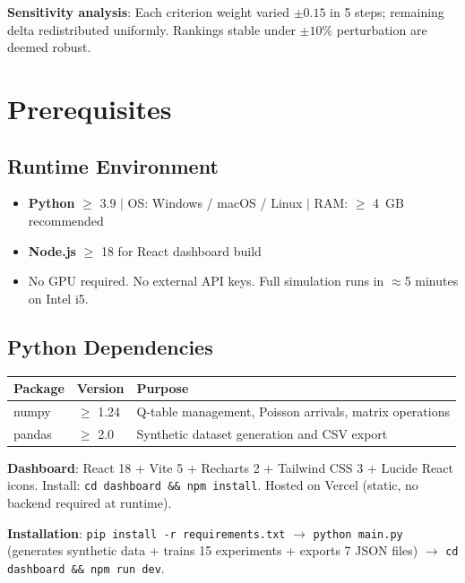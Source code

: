 \documentclass[11pt, a4paper]{article}
\begin{document}
\textbf{Sensitivity analysis}: Each criterion weight varied $\pm 0.15$ in 5 steps; remaining delta redistributed uniformly. Rankings stable under $\pm 10\%$ perturbation are deemed robust.

\section{Prerequisites}

\subsection{Runtime Environment}

\begin{itemize}[nosep, leftmargin=*]
    \item \textbf{Python} $\geq$ 3.9 $\mid$ OS: Windows / macOS / Linux $\mid$ RAM: $\geq$ 4~GB recommended
    \item \textbf{Node.js} $\geq$ 18 for React dashboard build
    \item No GPU required. No external API keys. Full simulation runs in $\approx$5 minutes on Intel i5.
\end{itemize}

\subsection{Python Dependencies}

\begin{table}[H]
\centering
\small
\begin{tabular}{lll}
    \toprule
    \textbf{Package} & \textbf{Version} & \textbf{Purpose} \\
    \midrule
    numpy & $\geq$ 1.24 & Q-table management, Poisson arrivals, matrix operations \\
    pandas & $\geq$ 2.0 & Synthetic dataset generation and CSV export \\
    \bottomrule
\end{tabular}
\end{table}

\textbf{Dashboard}: React 18 + Vite 5 + Recharts 2 + Tailwind CSS 3 + Lucide React icons. Install: \texttt{cd dashboard \&\& npm install}. Hosted on Vercel (static, no backend required at runtime).

\textbf{Installation}: \texttt{pip install -r requirements.txt} $\to$ \texttt{python main.py} (generates synthetic data + trains 15 experiments + exports 7 JSON files) $\to$ \texttt{cd dashboard \&\& npm run dev}.
\end{document}
